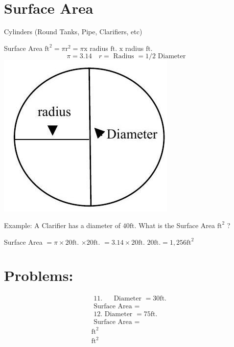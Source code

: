 \documentclass[10pt]{article}
\begin{document}
\section{Surface Area}
Cylinders (Round Tanks, Pipe, Clarifiers, etc)

Surface Area $\mathrm{ft}^{2}=\pi \mathrm{r}^{2}=\pi \mathrm{x}$ radius $\mathrm{ft}$. $\mathrm{x}$ radius $\mathrm{ft}$.
$$
\pi=3.14 \quad r=\text { Radius }=1 / 2 \text { Diameter }
$$
\includegraphics[max width=\textwidth]{2022_09_16_0c6b804a9b26a8df4e8fg-02}

Example: A Clarifier has a diameter of $40 \mathrm{ft}$. What is the Surface Area $\mathrm{ft}^{2}$ ?

Surface Area $=\pi \times 20 \mathrm{ft}$. $\times 20 \mathrm{ft}$. $=3.14 \times 20 \mathrm{ft}$. $20 \mathrm{ft} .=1,256 \mathrm{ft}^{2}$

\section{Problems:}
$$
\begin{aligned}
& \text { 11. } \quad \text { Diameter }=30 \mathrm{ft} \text {. } \\
& \text { Surface Area }= \\
& \text { 12. Diameter }=75 \mathrm{ft} \text {. } \\
& \text { Surface Area }= \\
& \mathrm{ft}^{2} \\
& \mathrm{ft}^{2}
\end{aligned}
$$
\end{document}
